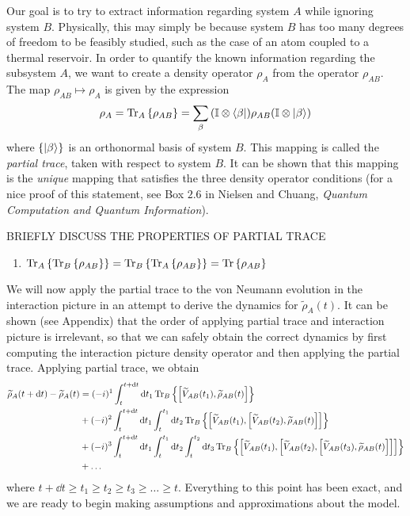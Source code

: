 \documentclass{article}
\newcommand{\ten}{\otimes}
\newcommand{\Tra}[1]{\Tr\left\{#1\right\}}
\newcommand{\Ptra}[2]{\Tr_{#1}\left\{#2\right\}}
\newcommand{\til}[1]{\widetilde{#1}}
\newcommand{\I}{\mathbb{I}}
\begin{document}
Our goal is to try to extract information regarding system $A$ while ignoring system $B$. Physically, this may simply be because system $B$ has too many degrees of freedom to be feasibly studied, such as the case of an atom coupled to a thermal reservoir. In order to quantify the known information regarding the subsystem $A$, we want to create a density operator $\rho_A$ from the operator $\rho_{AB}$. The map $\rho_{AB}\mapsto\rho_A$ is given by the expression
\begin{equation}\label{ptra}
\rho_A = \Ptra{A}{\rho_{AB}}=\sum_{\beta}\qty(\I\ten\bra{\beta})\rho_{AB}\qty(\I\ten\ket{\beta})
\end{equation}
where $\{\ket{\beta}\}$ is an orthonormal basis of system $B$. This mapping is called the \textit{partial trace}, taken with respect to system $B$. It can be shown that this mapping is the \textit{unique} mapping that satisfies the three density operator conditions (for a nice proof of this statement, see Box $2.6$ in Nielsen and Chuang, \textit{Quantum Computation and Quantum Information}).

BRIEFLY DISCUSS THE PROPERTIES OF PARTIAL TRACE
\begin{enumerate}
	\item $\Ptra{A}{\Ptra{B}{\rho_{AB}}} = \Ptra{B}{\Ptra{A}{\rho_{AB}}} = \Tra{\rho_{AB}}$
\end{enumerate}

We will now apply the partial trace to the von Neumann evolution in the interaction picture in an attempt to derive the dynamics for $\til{\rho}_A(t)$. It can be shown (see Appendix) that the order of applying partial trace and interaction picture is irrelevant, so that we can safely obtain the correct dynamics by first computing the interaction picture density operator and then applying the partial trace. Applying partial trace, we obtain
\begin{align}\label{partintpert}
\begin{split}
\til{\rho}_{A}(t+\dd{t}) - \til{\rho}_{A}(t) &= (-i)^1\int_t^{t+\dd{t}}\dd{t_1}\Ptra{B}{\comm{\til{V}_{AB}(t_1)}{\til{\rho}_{AB}(t)}}\\
&+(-i)^2\int_t^{t+\dd{t}}\dd{t_1}\int_t^{t_1}\dd{t_2}\Ptra{B}{\comm{\til{V}_{AB}(t_1)}{\comm{\til{V}_{AB}(t_2)}{\til{\rho}_{AB}(t)}}}\\
&+(-i)^3\int_t^{t+\dd{t}}\dd{t_1}\int_t^{t_1}\dd{t_2}\int_t^{t_2}\dd{t_3}\Ptra{B}{\comm{\til{V}_{AB}(t_1)}{\comm{\til{V}_{AB}(t_2)}{\comm{\til{V}_{AB}(t_3)}{\til{\rho}_{AB}(t)}}}}\\
&+\ldots
\end{split}
\end{align}
where $t+\dd{t}\geq t_1\geq t_2\geq t_3\geq \ldots\geq t$. Everything to this point has been exact, and we are ready to begin making assumptions and approximations about the model.
\end{document}
